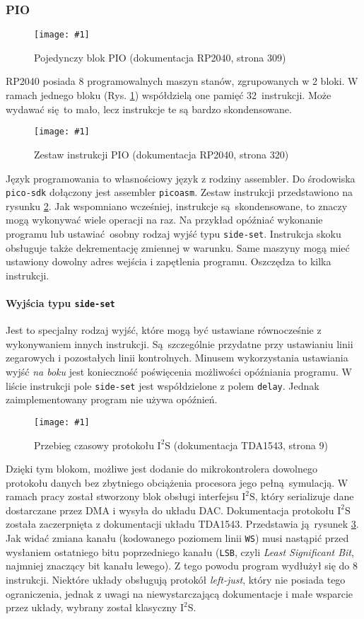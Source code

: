 \documentclass[12pt]{report}
\newcommand{\imgint}[4]{
	\begin{figure}[{#4}]
		\centering
		\texttt{[image: \#1]}
		\caption{#2}
		\label{#1}
	\end{figure}
}
\newcommand{\imgh}[3]{\imgint{#1}{#2}{#3}{H}}
\newcommand{\isqs}{$\text{I}^{2}\text{S}$}
\newcommand{\sset}{\lstinline|side-set|}
\begin{document}
			\subsubsection{PIO}
				\imgh{3/pio_block}{Pojedynczy blok PIO (dokumentacja RP2040\textsuperscript{\cite{pico_pdf}}, strona 309)}{0.7}
				
				RP2040 posiada 8 programowalnych maszyn stanów, zgrupowanych w 2 bloki. W ramach jednego bloku (Rys. \ref{3/pio_block}) współdzielą one pamięć 32 instrukcji. Może wydawać się to mało, lecz instrukcje te są bardzo skondensowane.
				
				\imgh{3/pio_instr}{Zestaw instrukcji PIO (dokumentacja RP2040, strona 320)}{0.7}
				Język programowania to własnościowy język z rodziny assembler. Do środowiska \lstinline|pico-sdk| dołączony jest assembler \lstinline|picoasm|. Zestaw instrukcji przedstawiono na rysunku \ref{3/pio_instr}. Jak wspomniano wcześniej, instrukcje są skondensowane, to znaczy mogą wykonywać wiele operacji na raz. Na przykład opóźniać wykonanie programu lub ustawiać osobny rodzaj wyjść typu \sset{}.
				Instrukcja skoku obsługuje także dekrementację zmiennej w warunku. Same maszyny mogą mieć ustawiony dowolny adres wejścia i zapętlenia programu. Oszczędza to kilka instrukcji.
				
				\paragraph{Wyjścia typu \sset{}}
					Jest to specjalny rodzaj wyjść, które mogą być ustawiane równocześnie z wykonywaniem innych instrukcji. Są szczególnie przydatne przy ustawianiu linii zegarowych i pozostałych linii kontrolnych. Minusem wykorzystania ustawiania wyjść \textit{na boku} jest konieczność poświęcenia możliwości opóźniania programu. W liście instrukcji pole \sset{} jest współdzielone z polem \lstinline|delay|. Jednak zaimplementowany program nie używa opóźnień.
				
				\imgh{3/pio_i2s_docs}{Przebieg czasowy protokołu \isqs{} (dokumentacja TDA1543\textsuperscript{\cite{tda_pdf}}, strona 9)}{0.9}
				Dzięki tym blokom, możliwe jest dodanie do mikrokontrolera dowolnego protokołu danych bez zbytniego obciążenia procesora jego pełną symulacją. W ramach pracy został stworzony blok obsługi interfejsu \isqs{}, który serializuje dane dostarczane przez DMA i wysyła do układu DAC.
				Dokumentacja protokołu \isqs{} została zaczerpnięta z dokumentacji układu TDA1543. Przedstawia ją rysunek \ref{3/pio_i2s_docs}. Jak widać zmiana kanału (kodowanego poziomem linii \lstinline|WS|)  musi nastąpić przed wysłaniem ostatniego bitu poprzedniego kanału (\lstinline|LSB|, czyli \textit{Least Significant Bit}, najmniej znaczący bit kanału lewego). Z tego powodu program wydłużył się do 8 instrukcji. Niektóre układy obsługują protokół \textit{left-just}, który nie posiada tego ograniczenia, jednak z uwagi na niewystarczającą dokumentacje i małe wsparcie przez układy, wybrany został klasyczny \isqs{}.
				
\end{document}
